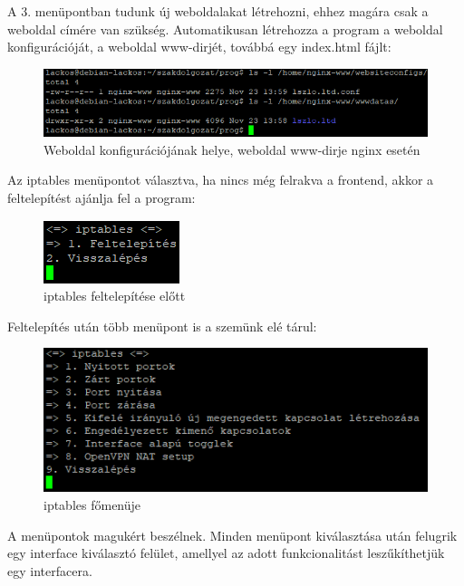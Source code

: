 A 3. menüpontban tudunk új weboldalakat létrehozni, ehhez magára csak a weboldal címére van szükség. Automatikusan létrehozza a program a weboldal konfigurációját, a weboldal www-dirjét, továbbá egy index.html fájlt:

\begin{figure}[h]
\centering
\includegraphics[scale=1]{images/website_config_dir_examples.png}
\caption{Weboldal konfigurációjának helye, weboldal www-dirje nginx esetén}
\end{figure}

\pagebreak


Az iptables menüpontot választva, ha nincs még felrakva a frontend, akkor a feltelepítést ajánlja fel a program:

\begin{figure}[h]
\centering
\includegraphics[scale=1]{images/iptables_before_install.png}
\caption{iptables feltelepítése előtt}
\end{figure}


Feltelepítés után több menüpont is a szemünk elé tárul:

\begin{figure}[h]
\centering
\includegraphics[scale=1]{images/iptables_mainmenu.png}
\caption{iptables főmenüje}
\end{figure}

A menüpontok magukért beszélnek. Minden menüpont kiválasztása után felugrik egy interface kiválasztó felület, amellyel az adott funkcionalitást leszűkíthetjük egy interfacera.

